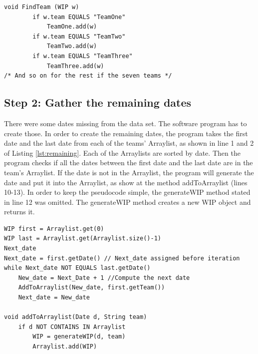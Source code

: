 \documentclass[UKenglish]{ifimaster}  %
\begin{document}
 
 \begin{lstlisting}[caption={Gather WIP object to the right data structure},label={lst:addWIP}]
void FindTeam (WIP w) 
		if w.team EQUALS "TeamOne"
			TeamOne.add(w)
		if w.team EQUALS "TeamTwo"
			TeamTwo.add(w)
		if w.team EQUALS "TeamThree"
			TeamThree.add(w)			
/* And so on for the rest if the seven teams */
 \end{lstlisting}
 \newpage
 
\subsection{Step 2: Gather the remaining dates}
 \label{sub:stepTwo}
There were some dates missing from the data set. The software program has to create those. In order to create the remaining dates, the program takes the first date and the last date from each of the teams' Arraylist, as shown in line 1 and 2 of Listing \ref{lst:remaining}. Each of the Arraylists are sorted by date. Then the program checks if all the dates between the first date and the last date are in the team's Arraylist. If the date is not in the Arraylist, the program will generate the date and put it into the Arraylist, as show at the method addToArraylist (lines 10-13). 
In order to keep the pseudocode simple, the generateWIP method stated in line 12 was omitted. The generateWIP method creates a new WIP object and returns it.

\begin{lstlisting}[caption={Gather the remaining dates.},label={lst:remaining}]
WIP first = Arraylist.get(0)
WIP last = Arraylist.get(Arraylist.size()-1)
Next_date 
Next_date = first.getDate() // Next_date assigned before iteration
while Next_date NOT EQUALS last.getDate()
	New_date = Next_Date + 1 //Compute the next date
	AddToArraylist(New_date, first.getTeam())
	Next_date = New_date

void addToArraylist(Date d, String team)
	if d NOT CONTAINS IN Arraylist
		WIP = generateWIP(d, team)
		Arraylist.add(WIP) 
 \end{lstlisting}
\end{document}
